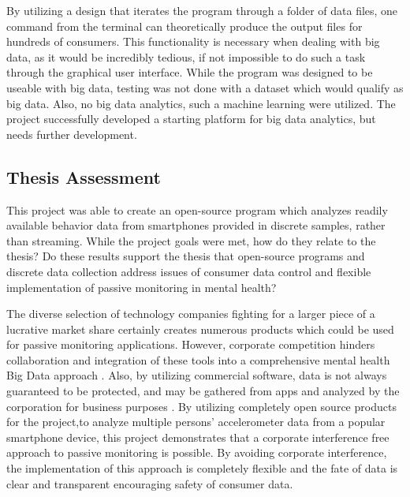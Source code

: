 \documentclass[sigconf]{acmart}
\begin{document}
By utilizing a design that iterates the program through a folder of data files, one command from the terminal can theoretically produce the output files for hundreds of consumers. This functionality is necessary when dealing with big data, as it would be incredibly tedious, if not impossible to do such a task through the graphical user interface. While the program was designed to be useable with big data, testing was not done with a dataset which would qualify as big data. Also, no big data analytics, such a machine learning were utilized. The project successfully developed a starting platform for big data analytics, but needs further development.

\subsection{Thesis Assessment}

This project was able to create an open-source program which analyzes readily available behavior data from smartphones provided in discrete samples, rather than streaming. While the project goals were met, how do they relate to the thesis? Do these results support the thesis that open-source programs and discrete data collection address issues of consumer data control and flexible implementation of passive monitoring in mental health?

The diverse selection of technology companies fighting for a larger piece of a lucrative market share certainly creates numerous products which could be used for passive monitoring applications. However, corporate competition hinders collaboration and integration of these tools into a comprehensive mental health Big Data approach \cite{openinfrastructure}. Also, by utilizing commercial software, data is not always guaranteed to be protected, and may be gathered from apps and analyzed by the corporation for business purposes \cite{bigdatabipolar}. By utilizing completely open source products for the project,to analyze multiple persons' accelerometer data from a popular smartphone device, this project demonstrates that a corporate interference free approach to passive monitoring is possible. By avoiding corporate interference, the implementation of this approach is completely flexible and the fate of data is clear and transparent encouraging safety of consumer data.
\end{document}
